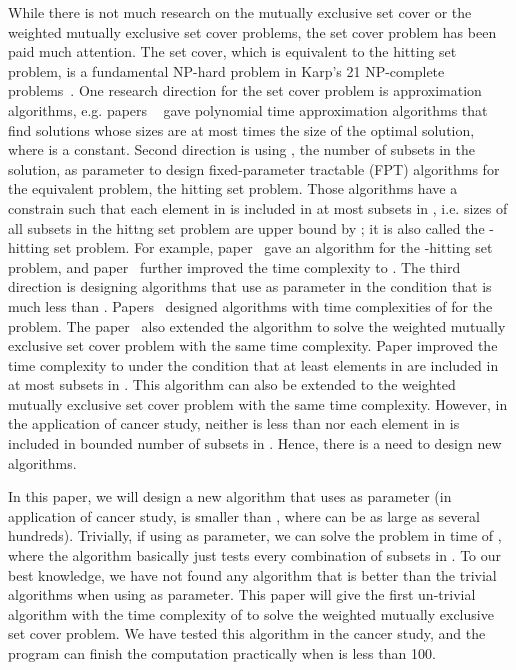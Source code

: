 \documentclass[11pt]{article}
\begin{document}
While there is not much research on the {\sc mutually exclusive
set cover} or the {\sc weighted mutually exclusive set cover}
problems, the {\sc set cover} problem has been paid much
attention. The {\sc set cover}, which is equivalent to the  {\sc
hitting set} problem, is a fundamental NP-hard problem in Karp's
21 NP-complete problems~\cite{Karp1972}. One research direction
for the {\sc set cover} problem is approximation algorithms, e.g.
papers ~\cite{alon,feige,Kolliopoulos,lund} gave polynomial time
approximation algorithms that find solutions whose sizes are at
most  times the size of the optimal solution, where 
is a constant. Second direction is using , the number of
subsets in the solution, as parameter to design fixed-parameter
tractable (FPT) algorithms for the equivalent problem, the {\sc
hitting set} problem. Those algorithms have a constrain such that
each element in  is included in at most  subsets in , i.e. sizes of all subsets in the {\sc hittng set} problem are
upper bound by ; it is also called the {\sc -hitting set}
problem. For example, paper~\cite{niedemedier} gave an
 algorithm for the {\sc -hitting set} problem,
and paper~\cite{fernau_2} further improved the time complexity to
. The third direction is designing algorithms that
use  as parameter in the condition that  is much less than
. Papers~\cite{bjorklund,Hua2} designed algorithms with time
complexities of  for the problem. The
paper~\cite{bjorklund} also extended the algorithm to solve the
{\sc weighted mutually exclusive set cover} problem with the same
time complexity. Paper \cite{Lu2011} improved the time complexity
to  under the condition that
at least  elements in  are included in at
most  subsets in . This algorithm can also be
extended to the {\sc weighted mutually exclusive set cover}
problem with the same time complexity. However, in the application
of cancer study, neither  is less than  nor each element in
 is included in bounded number of subsets in . Hence,
there is a need to design new algorithms.

In this paper, we will design a new algorithm that uses  as
parameter (in application of cancer study,  is smaller than
, where  can be as large as several hundreds). Trivially, if
using  as parameter, we can solve the problem in time of
, where the algorithm basically just tests every
combination of subsets in . To our best knowledge, we
have not found any algorithm that is better than the trivial
algorithms when using  as parameter. This paper will give the
first un-trivial algorithm with the time complexity of
 to solve the {\sc weighted mutually exclusive set
cover} problem. We have tested this algorithm in the cancer study,
and the program can finish the computation practically when  is
less than 100.
\end{document}
